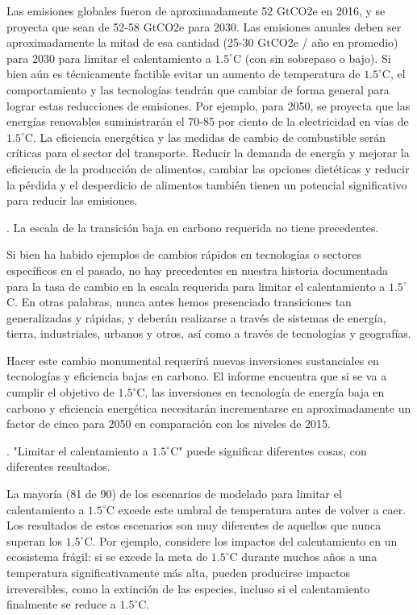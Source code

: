 \documentclass[12pt,a4paper]{article}
\begin{document}
\noindent Las emisiones globales fueron de aproximadamente 52 GtCO2e en 2016, y se proyecta que sean de 52-58 GtCO2e para 2030. Las emisiones anuales deben ser aproximadamente la mitad de esa cantidad (25-30 GtCO2e / año en promedio) para 2030 para limitar el calentamiento a $1.5^{\circ} $C (con sin sobrepaso o bajo). Si bien aún es técnicamente factible evitar un aumento de temperatura de $1.5^{\circ} $C, el comportamiento y las tecnologías tendrán que cambiar de forma general para lograr estas reducciones de emisiones. Por ejemplo, para 2050, se proyecta que las energías renovables suministrarán el 70-85 por ciento de la electricidad en vías de $1.5^{\circ} $C. La eficiencia energética y las medidas de cambio de combustible serán críticas para el sector del transporte. Reducir la demanda de energía y mejorar la eficiencia de la producción de alimentos, cambiar las opciones dietéticas y reducir la pérdida y el desperdicio de alimentos también tienen un potencial significativo para reducir las emisiones.



. La escala de la transición baja en carbono requerida no tiene precedentes.

\noindent Si bien ha habido ejemplos de cambios rápidos en tecnologías o sectores específicos en el pasado, no hay precedentes en nuestra historia documentada para la tasa de cambio en la escala requerida para limitar el calentamiento a $1.5^{\circ} $C. En otras palabras, nunca antes hemos presenciado transiciones tan generalizadas y rápidas, y deberán realizarse a través de sistemas de energía, tierra, industriales, urbanos y otros, así como a través de tecnologías y geografías.

\noindent Hacer este cambio monumental requerirá nuevas inversiones sustanciales en tecnologías y eficiencia bajas en carbono. El informe encuentra que si se va a cumplir el objetivo de $1.5^{\circ} $C, las inversiones en tecnología de energía baja en carbono y eficiencia energética necesitarán incrementarse en aproximadamente un factor de cinco para 2050 en comparación con los niveles de 2015.

. "Limitar el calentamiento a $1.5^{\circ} $C" puede significar diferentes cosas, con diferentes resultados.

\noindent La mayoría (81 de 90) de los escenarios de modelado para limitar el calentamiento a $1.5^{\circ} $C excede este umbral de temperatura antes de volver a caer. Los resultados de estos escenarios son muy diferentes de aquellos que nunca superan los $1.5^{\circ} $C. Por ejemplo, considere los impactos del calentamiento en un ecosistema frágil: si se excede la meta de $1.5^{\circ} $C durante muchos años a una temperatura significativamente más alta, pueden producirse impactos irreversibles, como la extinción de las especies, incluso si el calentamiento finalmente se reduce a $1.5^{\circ} $C.
\end{document}
